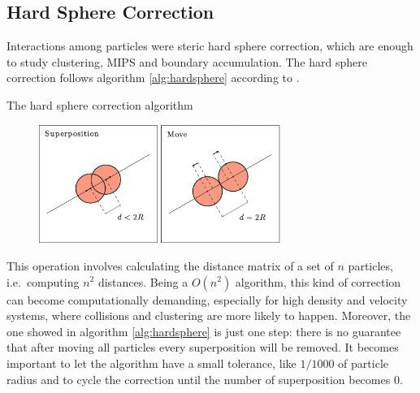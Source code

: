 \documentclass[../../master_thesis_np.tex]{subfiles}
\begin{document}
	\subsection{Hard Sphere Correction}
	Interactions among particles were steric hard sphere correction, which are enough to study clustering, MIPS and boundary accumulation. The hard sphere correction follows algorithm \ref{alg:hardsphere} according to \cite{callegari_numerical_2019}.
	

	\begin{algorithm}[htp]
		\caption{The hard sphere correction algorithm} \label{alg:hardsphere}	
		\begin{algorithmic}[1]
			 

			\EndIf
			\EndFor
		\end{algorithmic}
		\end{algorithm}

		\begin{figure}[htp]
			\centering
			\includegraphics[width = 0.7\textwidth]{callegari_volpe_2019_hardsphere.png}
			\label{fig:hardsphere}
			\caption{ \cite{callegari_numerical_2019}}
		\end{figure}

	This operation involves calculating the distance matrix of a set of $n$ particles, i.e.~computing $n^2$ distances. Being a $O(n^2)$ algorithm, this kind of correction can become computationally demanding, especially for high density and velocity systems, where collisions and clustering are more likely to happen. Moreover, the one showed in algorithm \ref{alg:hardsphere} is just one step: there is no guarantee that after moving all particles every superposition will be removed. It becomes important to let the algorithm have a small tolerance, like $1/1000$ of particle radius and to cycle the correction until the number of superposition becomes $0$.
	
\end{document}
